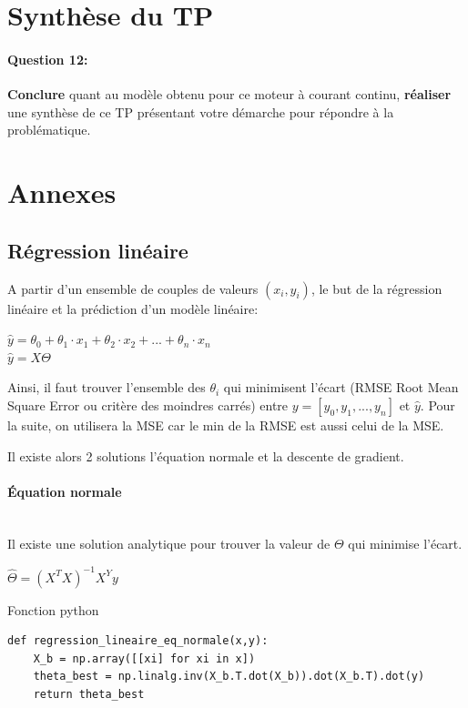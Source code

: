 \section{Synthèse du TP}

\paragraph{Question 12:} \textbf{Conclure} quant au modèle obtenu pour ce moteur à courant continu, \textbf{réaliser} une synthèse de ce TP présentant votre démarche pour répondre à la problématique.

\section{Annexes}

\subsection{Régression linéaire}

A partir d'un ensemble de couples de valeurs $(x_i,y_i)$, le but de la régression linéaire et la prédiction d'un modèle linéaire: \\
\begin{center}
$\hat{y}=\theta_0+\theta_1\cdot x_1+\theta_2\cdot x_2+...+\theta_n\cdot x_n$ \\
$\hat{y}=X \Theta$
\end{center}

Ainsi, il faut trouver l'ensemble des $\theta_i$ qui minimisent l'écart (RMSE Root Mean Square Error ou critère des moindres carrés) entre $y=[y_0, y_1,...,y_n]$ et $\hat{y}$. Pour la suite, on utilisera la MSE car le min de la RMSE est aussi celui de la MSE.

Il existe alors 2 solutions l'équation normale et la descente de gradient.

\paragraph{Équation normale} ~\ \\

Il existe une solution analytique pour trouver la valeur de $\Theta$ qui minimise l'écart.
\begin{center}
$\hat{\Theta}=(X^TX)^{-1}X^Yy$
\end{center}

Fonction python
\begin{lstlisting}
def regression_lineaire_eq_normale(x,y):
    X_b = np.array([[xi] for xi in x])
    theta_best = np.linalg.inv(X_b.T.dot(X_b)).dot(X_b.T).dot(y)
    return theta_best
\end{lstlisting}

